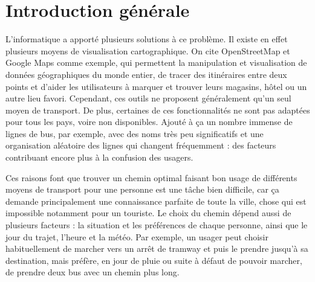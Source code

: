 \renewcommand\labelitemi{$\bullet$}
\renewcommand\labelitemii{$\circ$}
\chapter{Introduction générale}


L’informatique a apporté plusieurs solutions à ce problème. Il existe en effet plusieurs moyens de visualisation cartographique. On cite OpenStreetMap et Google Maps comme exemple, qui permettent la manipulation et visualisation de données géographiques du monde entier, de tracer des itinéraires entre deux points et d’aider les utilisateurs à marquer et trouver leurs magasins, hôtel ou un autre lieu favori. Cependant, ces outils ne proposent généralement qu’un seul moyen de transport. De plus, certaines de ces fonctionnalités ne sont pas adaptées pour tous les pays, voire non disponibles. Ajouté à ça un nombre immense de lignes de bus, par exemple, avec des noms très peu significatifs et une organisation aléatoire des lignes qui changent fréquemment : des facteurs contribuant encore plus à la confusion des usagers.

Ces raisons font que trouver un chemin optimal faisant bon usage de différents moyens de transport pour une personne est une tâche bien difficile, car ça demande principalement une connaissance parfaite de toute la ville, chose qui est impossible notamment pour un touriste.
Le choix du chemin dépend aussi de plusieurs facteurs : la situation et les préférences de chaque personne, ainsi que le jour du trajet, l'heure et la météo.
Par exemple, un usager peut choisir habituellement de marcher vers un arrêt de tramway et puis le prendre jusqu'à sa destination, mais préfère, en jour de pluie ou suite à défaut de pouvoir marcher, de prendre deux bus avec un chemin plus long.

